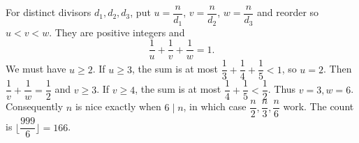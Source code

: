 For distinct divisors $d_1,d_2,d_3$, put $u=\dfrac{n}{d_1}$, $v=\dfrac{n}{d_2}$, $w=\dfrac{n}{d_3}$ and reorder so $u<v<w$. They are positive integers and
\[
\dfrac{1}{u}+\dfrac{1}{v}+\dfrac{1}{w}=1.
\]
We must have $u\ge2$. If $u\ge3$, the sum is at most $\dfrac{1}{3}+\dfrac{1}{4}+\dfrac{1}{5}<1$, so $u=2$. Then $\dfrac{1}{v}+\dfrac{1}{w}=\dfrac{1}{2}$ and $v\ge3$. If $v\ge4$, the sum is at most $\dfrac{1}{4}+\dfrac{1}{5}<\dfrac{1}{2}$. Thus $v=3,w=6$.
Consequently $n$ is nice exactly when $6\mid n$, in which case $\dfrac{n}{2},\dfrac{n}{3},\dfrac{n}{6}$ work. The count is $\boxed{\lfloor\dfrac{999}{6}\rfloor=166}$.
